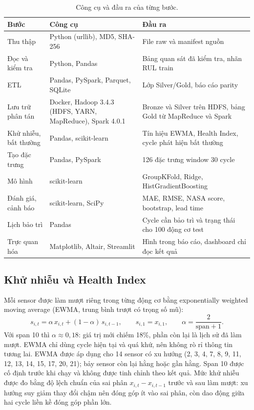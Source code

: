 \begin{table}[H]
\centering
\caption[Công cụ và đầu ra]{Công cụ và đầu ra của từng bước.}
\label{tab:tool-boundaries}
\small
\begin{tabular}{L{3.2cm}L{4.4cm}L{6.4cm}}
\toprule
Bước & Công cụ & Đầu ra \\
\midrule
Thu thập & Python (urllib), MD5, SHA-256 & File raw và manifest nguồn \\
Đọc và kiểm tra & Python, Pandas & Bảng quan sát đã kiểm tra, nhãn RUL train \\
ETL & Pandas, PySpark, Parquet, SQLite & Lớp Silver/Gold, báo cáo parity \\
Lưu trữ phân tán & Docker, Hadoop 3.4.3 (HDFS, YARN, MapReduce), Spark 4.0.1 & Bronze và Silver trên HDFS, bảng Gold từ MapReduce và Spark \\
Khử nhiễu, bất thường & Pandas, scikit-learn & Tín hiệu EWMA, Health Index, cycle phát hiện bất thường \\
Tạo đặc trưng & Pandas, PySpark & 126 đặc trưng window 30 cycle \\
Mô hình & scikit-learn & GroupKFold, Ridge, HistGradientBoosting \\
Đánh giá, cảnh báo & scikit-learn, SciPy & MAE, RMSE, NASA score, bootstrap, lead time \\
Lịch bảo trì & Pandas & Cycle cần bảo trì và trạng thái cho 100 động cơ test \\
Trực quan hóa & Matplotlib, Altair, Streamlit & Hình trong báo cáo, dashboard chỉ đọc kết quả \\
\bottomrule
\end{tabular}
\end{table}

\subsection{Khử nhiễu và Health Index}
\label{sec:denoise-method}
Mỗi sensor được làm mượt riêng trong từng động cơ bằng exponentially weighted
moving average (EWMA, trung bình trượt có trọng số mũ):
\begin{equation}
 s_{i,t}=\alpha\,x_{i,t}+(1-\alpha)\,s_{i,t-1},\qquad s_{i,1}=x_{i,1},\qquad
 \alpha=\frac{2}{\text{span}+1}.
 \label{eq:ewma}
\end{equation}
Với span 10 thì $\alpha\approx0{,}18$: giá trị mới chiếm 18\%, phần còn lại là
lịch sử đã làm mượt. EWMA chỉ dùng cycle hiện tại và quá khứ, nên không rò rỉ
thông tin tương lai. EWMA được áp dụng cho 14 sensor có xu hướng (2, 3, 4, 7, 8,
9, 11, 12, 13, 14, 15, 17, 20, 21); bảy sensor còn lại hằng hoặc gần hằng. Span 10
được cố định trước khi chạy và không được tinh chỉnh theo kết quả. Mức khử nhiễu
được đo bằng độ lệch chuẩn của sai phân $x_{i,t}-x_{i,t-1}$ trước và sau làm mượt:
xu hướng suy giảm thay đổi chậm nên đóng góp ít vào sai phân, còn dao động giữa hai
cycle liền kề đóng góp phần lớn.

